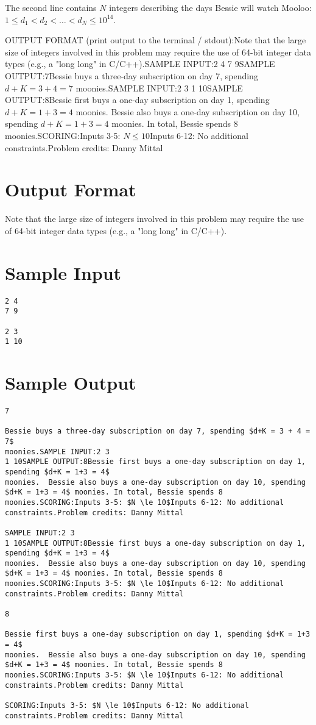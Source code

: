 \documentclass[12pt]{article}
\begin{document}
The second line contains $N$ integers describing the days Bessie will watch
Mooloo:
$1\le d_1<d_2<\dots<d_N\le 10^{14}$.

OUTPUT FORMAT (print output to the terminal / stdout):Note that the large size of integers involved in this problem may require the
use of 64-bit integer data types (e.g., a "long long" in C/C++).SAMPLE INPUT:2 4
7 9SAMPLE OUTPUT:7Bessie buys a three-day subscription on day 7, spending $d+K = 3 + 4 = 7$
moonies.SAMPLE INPUT:2 3
1 10SAMPLE OUTPUT:8Bessie first buys a one-day subscription on day 1, spending $d+K = 1+3 = 4$
moonies.  Bessie also buys a one-day subscription on day 10, spending
$d+K = 1+3 = 4$ moonies. In total, Bessie spends 8 moonies.SCORING:Inputs 3-5: $N \le 10$Inputs 6-12: No additional constraints.Problem credits: Danny Mittal

\section*{Output Format}
Note that the large size of integers involved in this problem may require the
use of 64-bit integer data types (e.g., a "long long" in C/C++).

\section*{Sample Input}
\begin{verbatim}
2 4
7 9

2 3
1 10
\end{verbatim}

\section*{Sample Output}
\begin{verbatim}
7

Bessie buys a three-day subscription on day 7, spending $d+K = 3 + 4 = 7$
moonies.SAMPLE INPUT:2 3
1 10SAMPLE OUTPUT:8Bessie first buys a one-day subscription on day 1, spending $d+K = 1+3 = 4$
moonies.  Bessie also buys a one-day subscription on day 10, spending
$d+K = 1+3 = 4$ moonies. In total, Bessie spends 8 moonies.SCORING:Inputs 3-5: $N \le 10$Inputs 6-12: No additional constraints.Problem credits: Danny Mittal

SAMPLE INPUT:2 3
1 10SAMPLE OUTPUT:8Bessie first buys a one-day subscription on day 1, spending $d+K = 1+3 = 4$
moonies.  Bessie also buys a one-day subscription on day 10, spending
$d+K = 1+3 = 4$ moonies. In total, Bessie spends 8 moonies.SCORING:Inputs 3-5: $N \le 10$Inputs 6-12: No additional constraints.Problem credits: Danny Mittal

8

Bessie first buys a one-day subscription on day 1, spending $d+K = 1+3 = 4$
moonies.  Bessie also buys a one-day subscription on day 10, spending
$d+K = 1+3 = 4$ moonies. In total, Bessie spends 8 moonies.SCORING:Inputs 3-5: $N \le 10$Inputs 6-12: No additional constraints.Problem credits: Danny Mittal

SCORING:Inputs 3-5: $N \le 10$Inputs 6-12: No additional constraints.Problem credits: Danny Mittal
\end{verbatim}
\end{document}
